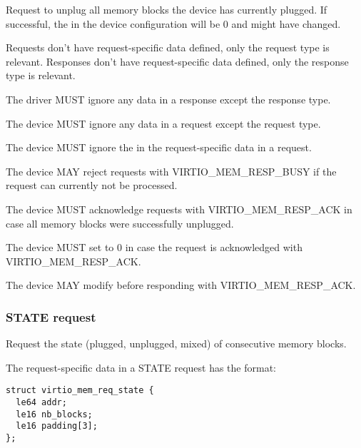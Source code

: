 Request to unplug all memory blocks the device has currently plugged.  If
successful, the  in the device configuration will be 0
and  might have changed.

Requests don't have request-specific data defined, only the request type is
relevant.  Responses don't have request-specific data defined, only the
response type is relevant.


The driver MUST ignore any data in a response except the response type.


The device MUST ignore any data in a request except the request type.

The device MUST ignore the  in the request-specific data in
a request.

The device MAY reject requests with VIRTIO_MEM_RESP_BUSY if the request can
currently not be processed.

The device MUST acknowledge requests with VIRTIO_MEM_RESP_ACK in case all
memory blocks were successfully unplugged.

The device MUST set  to 0 in case the request is
acknowledged with VIRTIO_MEM_RESP_ACK.

The device MAY modify  before responding with
VIRTIO_MEM_RESP_ACK.

\subsubsection{STATE request}\label{sec:Device Types / Memory Device / Device Operation / STATE request}

Request the state (plugged, unplugged, mixed) of consecutive memory blocks.

The request-specific data in a STATE request has the format:

\begin{lstlisting}
struct virtio_mem_req_state {
  le64 addr;
  le16 nb_blocks;
  le16 padding[3];
};
\end{lstlisting}

